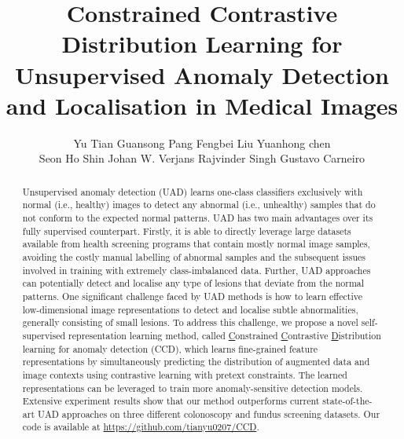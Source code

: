 \documentclass[runningheads]{llncs}
\begin{document}
\title{Constrained Contrastive Distribution Learning for Unsupervised Anomaly Detection and Localisation in Medical Images}

\author{Yu Tian
Guansong Pang  
Fengbei Liu  
Yuanhong chen \\
Seon Ho Shin 
Johan W. Verjans
Rajvinder Singh
Gustavo Carneiro}




\maketitle              \begin{abstract}



Unsupervised anomaly detection (UAD) learns one-class classifiers exclusively with normal (i.e., healthy) images to detect any abnormal (i.e., unhealthy) samples that do not conform to the expected normal patterns. UAD has two main advantages over its fully supervised counterpart. Firstly, it is able to directly leverage large datasets available from health screening programs that contain mostly normal image samples, avoiding the costly manual labelling of abnormal samples and the subsequent issues involved in training with extremely class-imbalanced data. Further, UAD approaches can potentially detect and localise any type of lesions that deviate from the normal patterns. One significant challenge faced by UAD methods is how to learn effective low-dimensional image representations to detect and localise subtle abnormalities, generally consisting of small lesions. To address this challenge, we propose a novel self-supervised representation learning method, called \underline{C}onstrained \underline{C}ontrastive \underline{D}istribution learning for anomaly detection (CCD), which learns fine-grained feature representations by simultaneously predicting the distribution of augmented data and image contexts using contrastive learning with pretext constraints. The learned representations can be leveraged to train more anomaly-sensitive detection models. Extensive experiment results show that our method outperforms current state-of-the-art UAD approaches on three different colonoscopy and fundus screening datasets. Our code is available at \url{https://github.com/tianyu0207/CCD}. 




\end{abstract}
\end{document}
